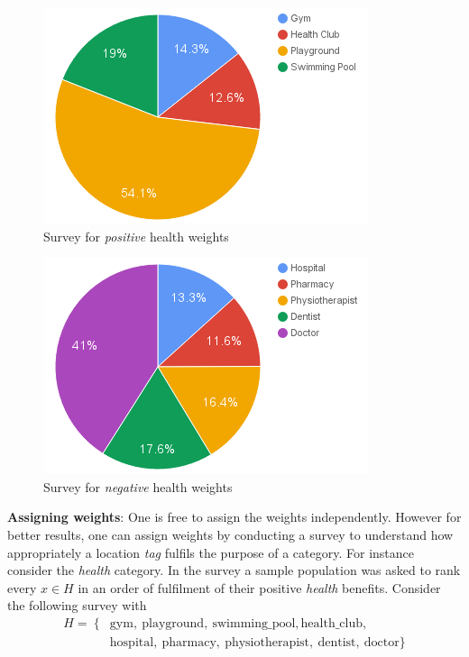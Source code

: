 \documentclass[conference]{IEEEtran}
\begin{document}
\begin{figure}[h!]
\centering
\captionsetup{justification=centering}
\noindent \includegraphics[scale=0.6]{fig2}
\caption{Survey for \textit{positive} health weights}
\end{figure}
\begin{figure}[h!]
\centering
\captionsetup{justification=centering}
\noindent \includegraphics[scale=0.6]{fig3}
\caption{Survey for \textit{negative} health weights}
\end{figure}
\textbf{Assigning weights}: One is free to assign the weights independently. However for better results, one can assign weights by conducting a survey to understand how appropriately a location \textit{tag} fulfils the purpose of a category. For instance consider the \textit{health} category. In the survey a sample population was asked to rank every $x \in H$ in an order of fulfilment of their positive \textit{health} benefits. Consider the following survey with 
\begin{align*}
H =\ \{&\text{gym},\ \text{playground},\ \text{swimming\_pool}, \text{health\_club},\\
&\text{hospital},\ \text{pharmacy},\ \text{physiotherapist},\ \text{dentist},\ \text{doctor}\}
\end{align*}
\end{document}
